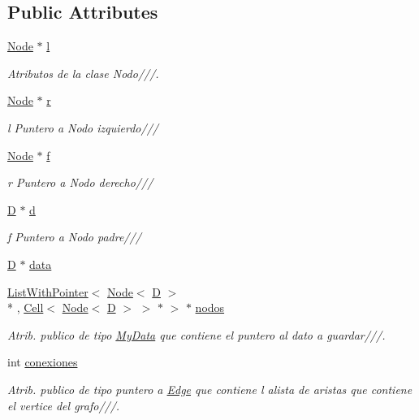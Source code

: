 \subsection*{Public Attributes}
\begin{DoxyCompactItemize}
\item 
\hyperlink{class_node}{Node} $\ast$ \hyperlink{class_node_a0887ae573dd58274be628313b5170186}{l}
\begin{DoxyCompactList}\small\item\em Atributos de la clase Nodo///. \end{DoxyCompactList}\item 
\hyperlink{class_node}{Node} $\ast$ \hyperlink{class_node_a61cefac7cf9a73b5057968706f6931fe}{r}
\begin{DoxyCompactList}\small\item\em l Puntero a Nodo izquierdo/// \end{DoxyCompactList}\item 
\hyperlink{class_node}{Node} $\ast$ \hyperlink{class_node_a33f853af2475252e43c437811478fae1}{f}
\begin{DoxyCompactList}\small\item\em r Puntero a Nodo derecho/// \end{DoxyCompactList}\item 
\hyperlink{gwp_2main_8cpp_af316c33cc298530f245e8b55330e86b5}{D} $\ast$ \hyperlink{class_node_ab9a8975b57edc70d79492408a950c666}{d}
\begin{DoxyCompactList}\small\item\em f Puntero a Nodo padre/// \end{DoxyCompactList}\item 
\hyperlink{gwp_2main_8cpp_af316c33cc298530f245e8b55330e86b5}{D} $\ast$ \hyperlink{class_node_a94c115991edeecf6664eaa4884fbf6ca}{data}
\item 
\hyperlink{class_list_with_pointer}{List\+With\+Pointer}$<$ \hyperlink{class_node}{Node}$<$ \hyperlink{gwp_2main_8cpp_af316c33cc298530f245e8b55330e86b5}{D} $>$\\*
, \hyperlink{class_cell}{Cell}$<$ \hyperlink{class_node}{Node}$<$ \hyperlink{gwp_2main_8cpp_af316c33cc298530f245e8b55330e86b5}{D} $>$ $>$ $\ast$ $>$ $\ast$ \hyperlink{class_node_a7c58a21705e05644b17d7a46f8c11d18}{nodos}
\begin{DoxyCompactList}\small\item\em Atrib. publico de tipo \hyperlink{class_my_data}{My\+Data} que contiene el puntero al dato a guardar///. \end{DoxyCompactList}\item 
int \hyperlink{class_node_a8dd8d5c2b989c76aa9414ecc0615f233}{conexiones}
\begin{DoxyCompactList}\small\item\em Atrib. publico de tipo puntero a \hyperlink{class_edge}{Edge} que contiene l alista de aristas que contiene el vertice del grafo///. \end{DoxyCompactList}\end{DoxyCompactItemize}


